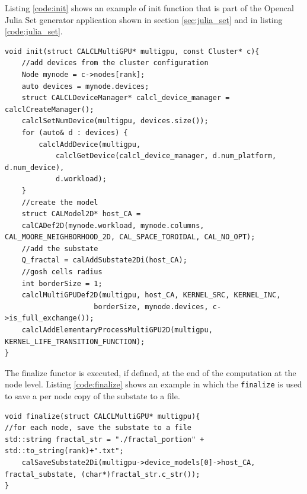 Listing \ref{code:init} shows an example of init function that is part of the Opencal Julia Set generator application shown in section \ref{sec:julia_set} and in listing \ref{code:julia_set}.
\begin{lstlisting}
void init(struct CALCLMultiGPU* multigpu, const Cluster* c){
	//add devices from the cluster configuration
	Node mynode = c->nodes[rank];
	auto devices = mynode.devices;
	struct CALCLDeviceManager* calcl_device_manager = calclCreateManager();
	calclSetNumDevice(multigpu, devices.size());
	for (auto& d : devices) {
		calclAddDevice(multigpu, 
			calclGetDevice(calcl_device_manager, d.num_platform, d.num_device),
			d.workload);
	}
	//create the model	
	struct CALModel2D* host_CA =
	calCADef2D(mynode.workload, mynode.columns, CAL_MOORE_NEIGHBORHOOD_2D, CAL_SPACE_TOROIDAL, CAL_NO_OPT);
	//add the substate
	Q_fractal = calAddSubstate2Di(host_CA);
	//gosh cells radius
	int borderSize = 1;
	calclMultiGPUDef2D(multigpu, host_CA, KERNEL_SRC, KERNEL_INC,
					 borderSize, mynode.devices, c->is_full_exchange());
	calclAddElementaryProcessMultiGPU2D(multigpu, 	KERNEL_LIFE_TRANSITION_FUNCTION);
}
\end{lstlisting}

The finalize functor is executed, if defined, at the end of the computation at the node level. Listing \ref{code:finalize} shows an example in which the \texttt{finalize} is used to save a per node copy of the substate to a file.
\begin{lstlisting}
void finalize(struct CALCLMultiGPU* multigpu){
//for each node, save the substate to a file
std::string fractal_str = "./fractal_portion" + std::to_string(rank)+".txt";
	calSaveSubstate2Di(multigpu->device_models[0]->host_CA, fractal_substate, (char*)fractal_str.c_str());
}
\end{lstlisting}

